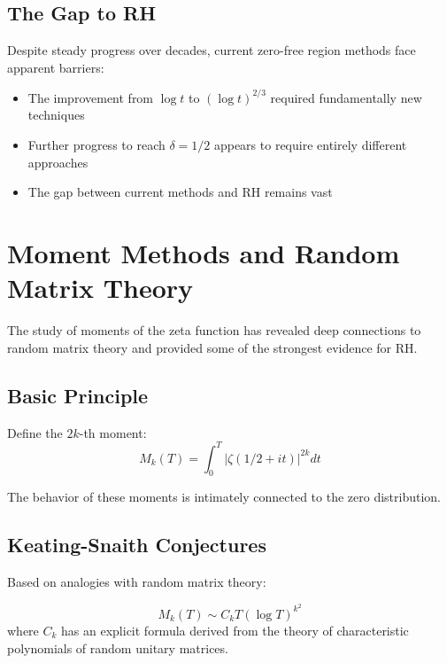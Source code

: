 \subsection{The Gap to RH}

\begin{remark}
Despite steady progress over decades, current zero-free region methods face apparent barriers:
\begin{itemize}
\item The improvement from $\log t$ to $(\log t)^{2/3}$ required fundamentally new techniques
\item Further progress to reach $\delta = 1/2$ appears to require entirely different approaches
\item The gap between current methods and RH remains vast
\end{itemize}
\end{remark}

\section{Moment Methods and Random Matrix Theory}

The study of moments of the zeta function has revealed deep connections to random matrix theory and provided some of the strongest evidence for RH.

\subsection{Basic Principle}

Define the $2k$-th moment:
\begin{equation}
M_k(T) = \int_0^T |\zeta(1/2 + it)|^{2k} dt
\end{equation}

The behavior of these moments is intimately connected to the zero distribution.

\subsection{Keating-Snaith Conjectures}

Based on analogies with random matrix theory:

\begin{conjecture}
\begin{equation}
M_k(T) \sim C_k T(\log T)^{k^2}
\end{equation}
where $C_k$ has an explicit formula derived from the theory of characteristic polynomials of random unitary matrices.
\end{conjecture}

